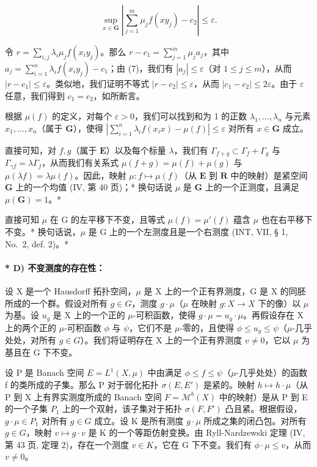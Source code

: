 \[
\sup _ {x \in \mathbf {G}} \left| \sum_ {j = 1} ^ {m} \mu_ {j} f (x y _ {j}) - c _ {2} \right| \leqslant \varepsilon .\tag{8}
\]

令 \(r = \sum_{i,j} \lambda_i \mu_j f(x_i y_j)\)。那么 \(r - c_1 = \sum_{j=1}^{m} \mu_j a_j\)，其中 \(a_j = \sum_{i=1}^{n} \lambda_i f(x_i y_j) - c_1\)；由 (7)，我们有 \(|a_j| \leqslant \varepsilon\)（对 \(1 \leqslant j \leqslant m\)），从而 \(|r - c_1| \leqslant \varepsilon\)。类似地，我们证明不等式 \(|r - c_2| \leqslant \varepsilon\)，从而 \(|c_1 - c_2| \leqslant 2\varepsilon\)。由于 \(\varepsilon\) 任意，我们得到 \(c_1 = c_2\)，如所断言。

根据 \(\mu(f)\) 的定义，对每个 \(\varepsilon > 0\)，我们可以找到和为 1 的正数 \(\lambda_1, \ldots, \lambda_n\) 与元素 \(x_1, \ldots, x_n\)（属于 \(\mathbf{G}\)），使得 \(\left|\sum_{i=1}^{n} \lambda_i f(x_i x) - \mu(f)\right| \leqslant \varepsilon\) 对所有 \(x \in \mathbf{G}\) 成立。

直接可知，对 \(f, g\)（属于 \(\mathbf{E}\)）以及每个标量 \(\lambda\)，我们有 \(\Gamma_{f + g} \subset \Gamma_f + \Gamma_g\) 与 \(\Gamma_{\gamma f} = \lambda \Gamma_f\)，从而我们有关系式 \(\mu(f + g) = \mu(f) + \mu(g)\) 与 \(\mu(\lambda f) = \lambda \mu(f)\)。因此，映射 \(\mu : f \mapsto \mu(f)\)（从 \(\mathbf{E}\) 到 \(\mathbf{R}\) 中的映射）是紧空间 \(\mathbf{G}\) 上的一个均值 (IV, 第 40 页)；* 换句话说 \(\mu\) 是 \(\mathbf{G}\) 上的一个正测度，且满足 \(\mu(\mathbf{G}) = 1\)。*

直接可知 \(\mu\) 在 G 的左平移下不变，且等式 \(\mu(f) = \mu'(f)\) 蕴含 \(\mu\) 也在右平移下不变。* 换句话说，\(\mu\) 是 G 上的一个左测度且是一个右测度 (INT, VII, § 1, No.~2, def. 2)。*

\paragraph{* D) 不变测度的存在性：}

设 X 是一个 Hausdorff 拓扑空间，\(\mu\) 是 X 上的一个正有界测度，G 是 X 的同胚所成的一个群。假设对所有 \(g \in G\)，测度 \(g \cdot \mu\)（\(\mu\) 在映射 \(g : X \to X\) 下的像）以 \(\mu\) 为基。设 \(u_g\) 是 X 上的一个正的 \(\mu\)-可积函数，使得 \(g \cdot \mu = u_g \cdot \mu\)。再假设存在 X 上的两个正的 \(\mu\)-可积函数 \(\phi\) 与 \(\psi\)，它们不是 \(\mu\)-零的，且使得 \(\phi \leqslant u_g \leqslant \psi\)（\(\mu\)-几乎处处，对所有 \(g \in G\)）。我们将证明存在 X 上的一个正有界测度 \(v \neq 0\)，它以 \(\mu\) 为基且在 G 下不变。

设 P 是 Banach 空间 \(E = L^{1}(X, \mu)\) 中由满足 \(\phi \leqslant f \leqslant \psi\)（\(\mu\)-几乎处处）的函数 f 的类所成的子集。那么 P 对于弱化拓扑 \(\sigma(E, E')\) 是紧的。映射 \(h \mapsto h \cdot \mu\)（从 P 到 X 上有界实测度所成的 Banach 空间 \(F = \mathcal{M}^{b}(X)\) 中的映射）是从 P 到 E 的一个子集 \(P_{1}\) 上的一个双射，该子集对于拓扑 \(\sigma(F, F')\) 凸且紧。根据假设，\(g \cdot \mu \in P_{1}\) 对所有 \(g \in G\) 成立。设 K 是所有测度 \(g \cdot \mu\) 所成之集的闭凸包。对所有 \(g \in G\)，映射 \(v \mapsto g \cdot v\) 是 K 的一个等距仿射变换。由 Ryll-Nardzewski 定理 (IV, 第 43 页, 定理 2)，存在一个测度 \(v \in K\)，它在 G 下不变。我们有 \(\phi \cdot \mu \leqslant v\)，从而 \(v \neq 0\)。

\closechapterappendix
